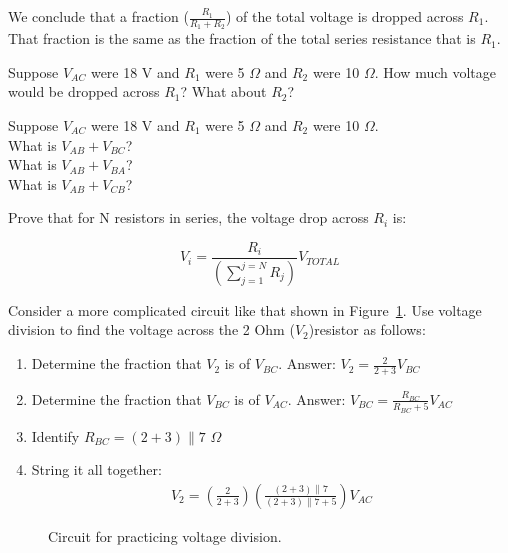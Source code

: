 We conclude that a fraction ($\frac{R_1}{R_1+R_2}$) of the total voltage is dropped across $R_1$. That fraction is the same as the fraction of the total series resistance that is $R_1$.
\par


\begin{alevel}
Suppose $V_{AC}$ were 18 V and $R_1$ were 5 $\Omega$ and $R_2$ were 10 $\Omega$. How much voltage would be dropped across $R_1$? What about $R_2$?
\end{alevel}

\begin{blevel}
Suppose $V_{AC}$ were 18 V and $R_1$ were 5 $\Omega$ and $R_2$ were 10 $\Omega$.\\
What is $V_{AB}+V_{BC}$?\\
What is $V_{AB}+V_{BA}$?\\
What is $V_{AB}+V_{CB}$?
\end{blevel}

\begin{dlevel}
Prove that for N resistors in series, the voltage drop across $R_i$ is:
\par
\[ V_i=\frac{R_i}{(\sum\limits_{j=1}^{j=N} R_j)}V_{TOTAL} \]
\end{dlevel}

Consider a more complicated circuit like that shown in Figure~\ref{F:3VD}. Use voltage division to find the voltage across the 2 Ohm ($V_2$)resistor as follows:

\begin{enumerate}
\item Determine the fraction that $V_2$ is of $V_{BC}$. Answer: $V_2=\frac{2}{2+3}V_{BC}$
\item Determine the fraction that $V_{BC}$ is of $V_{AC}$. Answer: $V_{BC}=\frac{R_{BC}}{R_{BC}+5}V_{AC}$
\item Identify $R_{BC} = (2+3) \parallel 7$ $\Omega$
\item String it all together: 
\begin{align}
V_2=(\frac{2}{2+3})(\frac{(2+3) \parallel 7}{(2+3) \parallel 7+5})V_{AC}
\end{align}
\end{enumerate}

\par
\begin{figure}[H]
\begin{center}
\caption{Circuit for practicing voltage division.}
\label{F:3VD}
\end{center}
\end{figure}


